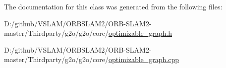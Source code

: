 The documentation for this class was generated from the following files\+:\begin{DoxyCompactItemize}
\item 
D\+:/github/\+V\+S\+L\+A\+M/\+O\+R\+B\+S\+L\+A\+M2/\+O\+R\+B-\/\+S\+L\+A\+M2-\/master/\+Thirdparty/g2o/g2o/core/\mbox{\hyperlink{optimizable__graph_8h}{optimizable\+\_\+graph.\+h}}\item 
D\+:/github/\+V\+S\+L\+A\+M/\+O\+R\+B\+S\+L\+A\+M2/\+O\+R\+B-\/\+S\+L\+A\+M2-\/master/\+Thirdparty/g2o/g2o/core/\mbox{\hyperlink{optimizable__graph_8cpp}{optimizable\+\_\+graph.\+cpp}}\end{DoxyCompactItemize}

